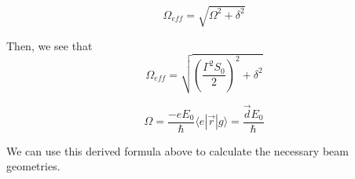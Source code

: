 \begin{equation}
\Omega_\mathit{eff}=\sqrt{\Omega^2+\delta^2}
\end{equation}

Then, we see that 
\begin{equation}
\Omega_\mathit{eff}=\sqrt{\left(\frac{\Gamma^2S_0}{2}\right)^2 + \delta^2}
\end{equation}

\begin{equation}
\Omega = \frac{-eE_0}{\hbar}\langle e |\vec{r}|g\rangle=\frac{\vec{d}E_0}{\hbar}
\end{equation}

%
%


%
%
%


%


We can use this derived formula above to calculate the necessary beam geometries. %


